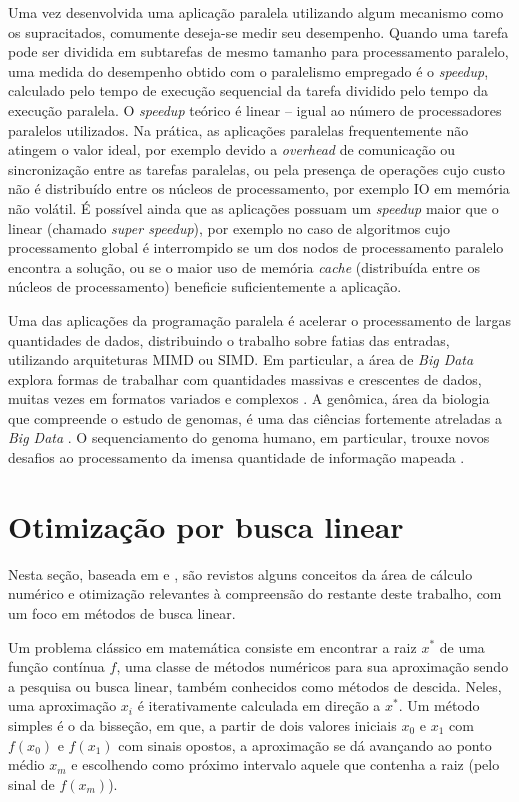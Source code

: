 \documentclass[cic,tc]{iiufrgs}
\begin{document}
Uma vez desenvolvida uma aplicação paralela utilizando algum mecanismo como os
supracitados, comumente deseja-se medir seu desempenho. Quando uma tarefa pode
ser dividida em subtarefas de mesmo tamanho para processamento paralelo, uma
medida do desempenho obtido com o paralelismo empregado é o \textit{speedup},
calculado pelo tempo de execução sequencial da tarefa dividido pelo tempo da
execução paralela. O \textit{speedup} teórico é linear -- igual ao número de
processadores paralelos utilizados. Na prática, as aplicações paralelas
frequentemente não atingem o valor ideal, por exemplo devido a
\textit{overhead} de comunicação ou sincronização entre as tarefas paralelas,
ou pela presença de operações cujo custo não é distribuído entre os núcleos de
processamento, por exemplo IO em memória não volátil. É possível ainda que as
aplicações possuam um \textit{speedup} maior que o linear (chamado
\textit{super speedup}), por exemplo no caso de algoritmos cujo processamento
global é interrompido se um dos nodos de processamento paralelo encontra a
solução, ou se o maior uso de memória \textit{cache} (distribuída entre os
núcleos de processamento) beneficie suficientemente a aplicação.

Uma das aplicações da programação paralela é acelerar o processamento de largas
quantidades de dados, distribuindo o trabalho sobre fatias das entradas,
utilizando arquiteturas MIMD ou SIMD. Em particular, a área de \textit{Big
Data} explora formas de trabalhar com quantidades massivas e crescentes de
dados, muitas vezes em formatos variados e complexos \cite{6567202}
\cite{nsr2014bigdata}. A genômica, área da biologia que compreende o estudo de
genomas, é uma das ciências fortemente atreladas a \textit{Big Data}
\cite{nsr2014bigdata} \cite{stephens2015big}. O sequenciamento do genoma
humano, em particular, trouxe novos desafios ao processamento da imensa
quantidade de informação mapeada \cite{baxevanis2020bioinformatics}.

\section{Otimização por busca linear}
\label{sec:bfgs}

Nesta seção, baseada em \cite{stewart1991calculus} e
\cite{nocedal2006numerical}, são revistos alguns conceitos da área de cálculo
numérico e otimização relevantes à compreensão do restante deste trabalho, com
um foco em métodos de busca linear.

Um problema clássico em matemática consiste em encontrar a raiz $x^*$ de uma
função contínua $f$, uma classe de métodos numéricos para sua aproximação sendo
a pesquisa ou busca linear, também conhecidos como métodos de descida. Neles,
uma aproximação $x_i$ é iterativamente calculada em direção a $x^*$. Um método
simples é o da bisseção, em que, a partir de dois valores iniciais $x_0$ e
$x_1$ com $f(x_0)$ e $f(x_1)$ com sinais opostos, a aproximação se dá avançando
ao ponto médio $x_m$ e escolhendo como próximo intervalo aquele que contenha a
raiz (pelo sinal de $f(x_m)$).
\end{document}
